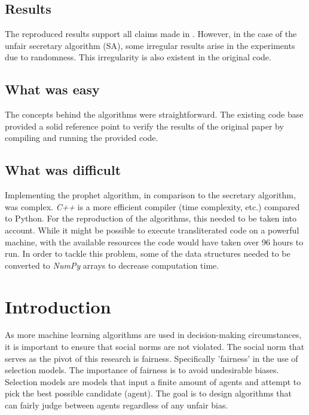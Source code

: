     \subsection*{Results}
    The reproduced results support all claims made in \citep{correa2021fairness}. However, in the case of the unfair secretary algorithm (SA), some irregular results arise in the experiments due to randomness. This irregularity is also existent in the original code.


    \subsection*{What was easy}
    The concepts behind the algorithms were straightforward. The existing code base provided a solid reference point to verify the results of the original paper by compiling and running the provided code.


    \subsection*{What was difficult}
    Implementing the prophet algorithm, in comparison to the secretary algorithm, was complex. \textit{C++} is a more efficient compiler (time complexity, etc.) compared to Python. For the reproduction of the algorithms, this needed to be taken into account. While it might be possible to execute transliterated code on a powerful machine, with the available resources the code would have taken over 96 hours to run. In order to tackle this problem, some of the data structures needed to be converted to \textit{NumPy} arrays to decrease computation time.



\section{Introduction}
As more machine learning algorithms are used in decision-making circumstances, it is important to ensure that social norms are not violated. The social norm that serves as the pivot of this research is fairness. Specifically 'fairness' in the use of selection models. The importance of fairness is to avoid undesirable biases. Selection models are models that input a finite amount of agents and attempt to pick the best possible candidate (agent). The goal is to design algorithms that can fairly judge between agents regardless of any unfair bias.


